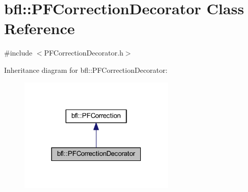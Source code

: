 \hypertarget{classbfl_1_1PFCorrectionDecorator}{}\section{bfl\+:\+:P\+F\+Correction\+Decorator Class Reference}
\label{classbfl_1_1PFCorrectionDecorator}


{\ttfamily \#include $<$P\+F\+Correction\+Decorator.\+h$>$}



Inheritance diagram for bfl\+:\+:P\+F\+Correction\+Decorator\+:
\nopagebreak
\begin{figure}[H]
\begin{center}
\leavevmode
\includegraphics[width=211pt]{classbfl_1_1PFCorrectionDecorator__inherit__graph}
\end{center}
\end{figure}
